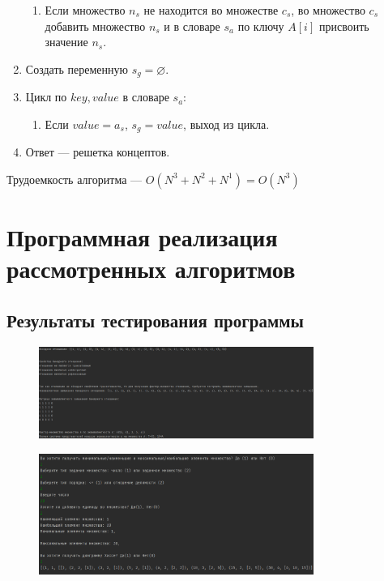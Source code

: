 \documentclass[bachelor, och, labwork]{shiza}
\begin{document}
\begin{enumerate}
\begin{enumerate}
            \item Если множество $n_s$ не находится во множестве $c_s$, во множество $c_s$ добавить множество $n_s$
                  и в словаре $s_a$ по ключу $A[i]$ присвоить значение $n_s$.
        \end{enumerate}
    \item Создать переменную $s_g =\varnothing$.
    \item Цикл по $key,value$ в словаре $s_a$:
        \begin{enumerate} \item Если $value=a_s$, $s_g = value$, выход из цикла.\end{enumerate}
    \item Ответ --- решетка концептов.
\end{enumerate}
Трудоемкость алгоритма --- $O(N^3 + N^2 + N^1) = O(N^3)$

\section{Программная реализация рассмотренных алгоритмов}
    
    \subsection{Результаты тестирования программы}

        \begin{figure}[H]
            \centering
            \includegraphics[width=0.8\textwidth]{pic/1.png}
            \caption{}
        \end{figure}

        
        \begin{figure}[H]
            \centering
            \includegraphics[width=0.8\textwidth]{pic/2.png}
            \caption{}
        \end{figure}
\end{document}
